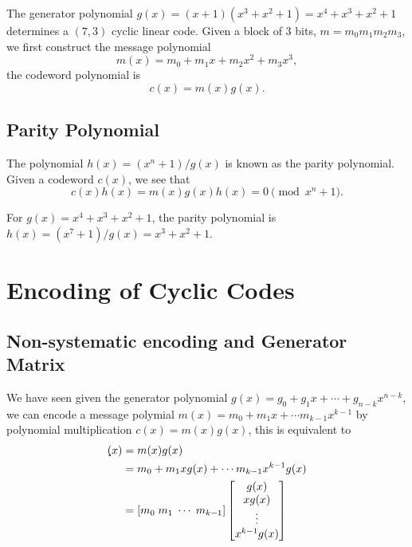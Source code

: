 \begin{example}
The generator polynomial \(g(x)=(x+1)(x^3 + x^2 + 1)=x^4 + x^3 + x^2 + 1\) determines a \((7,3)\) cyclic linear code.  
Given a block of \(3\) bits, \(m=m_0m_1m_2m_3\), we first construct the message polynomial 
\[m(x) = m_0  + m_1 x + m_2 x^2 + m_3 x^3,\]
the codeword polynomial is 
\[c(x)=m(x) g(x).\]
\label{ex:cyclic74}
\end{example}

\subsection{Parity Polynomial}
\begin{definition}
The polynomial \(h(x)=(x^n+1)/g(x)\) is known as the parity polynomial. Given a codeword \(c(x)\), we see that \[c(x)h(x) = m(x) g(x) h(x) = 0 \pmod{x^n + 1}.\]
\end{definition}

\begin{example}
For \(g(x) = x^4 + x^3 + x^2 + 1\), the parity polynomial is \(h(x)=(x^7+1) / g(x) = x^3 + x^2 + 1\).
\end{example}


\section{Encoding of Cyclic Codes}
\subsection{Non-systematic encoding and Generator Matrix}
We have seen given the generator polynomial \(g(x)= g_0 + g_1 x + \cdots + g_{n-k} x^{n-k}\), we can encode a message polymial \(m(x) = m_0 + m_1 x + \cdots m_{k-1}x^{k-1}\) by polynomial multiplication \(c(x) = m(x) g(x)\), this is equivalent to 
\begin{align}
\c(x)  &= m(x) g(x) \nonumber\\ 
      &= m_0 + m_1 xg(x) + \cdots m_{k-1}x^{k-1}g(x) \\
      &= [m_0 \; m_1 \; \cdots \; m_{k-1} ]\begin{bmatrix}
           g(x) \\
           xg(x) \\
           \vdots \\
           x^{k-1} g(x)
         \end{bmatrix} \nonumber
\end{align}

